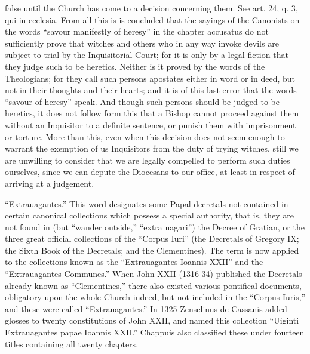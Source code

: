        false until the Church has come to a decision concerning them. See art. 24, q. 3, qui in
       ecclesia.
             From all this is is concluded that the sayings of the Canonists on the words “savour
       manifestly of heresy” in the chapter accusatus do not sufficiently prove that witches and
       others who in any way invoke devils are subject to trial by the Inquisitorial Court; for it is
       only by a legal fiction that they judge such to be heretics. Neither is it proved by the words
       of the Theologians; for they call such persons apostates either in word or in deed, but not in
       their thoughts and their hearts; and it is of this last error that the words “savour of heresy”
       speak.
             And though such persons should be judged to be heretics, it does not follow form this
       that a Bishop cannot proceed against them without an Inquisitor to a definite sentence, or
       punish them with imprisonment or torture. More than this, even when this decision does not
       seem enough to warrant the exemption of us Inquisitors from the duty of trying witches, still
       we are unwilling to consider that we are legally compelled to perform such duties ourselves,
       since we can depute the Diocesans to our office, at least in respect of arriving at a
       judgement.


            “Extrauagantes.” This word designates some Papal decretals not contained in certain
        canonical collections which possess a special authority, that is, they are not found in (but
        “wander outside,” “extra uagari”) the Decree of Gratian, or the three great official
        collections of the “Corpus Iuri” (the Decretals of Gregory IX; the Sixth Book of the
        Decretals; and the Clementines). The term is now applied to the collections known as the
        “Extrauagantes Ioannis XXII” and the “Extrauagantes Communes.” When John XXII
        (1316-34) published the Decretals already known as “Clementines,” there also existed
        various pontifical documents, obligatory upon the whole Church indeed, but not included in
        the “Corpus Iuris,” and these were called “Extrauagantes.” In 1325 Zenselinus de
        Cassanis added glosses to twenty constitutions of John XXII, and named this collection
        “Uiginti Extrauagantes papae Ioannis XXII.” Chappuis also classified these under fourteen
        titles containing all twenty chapters.


